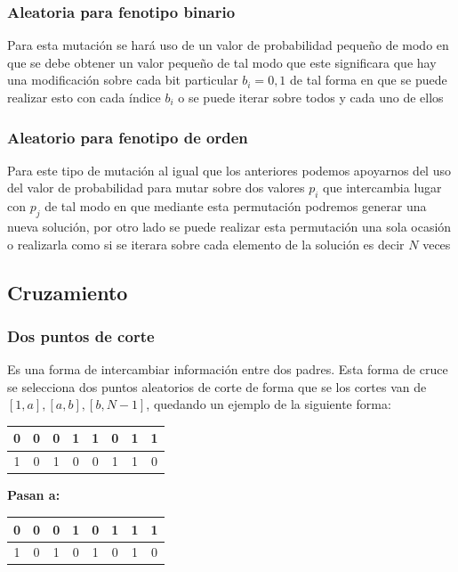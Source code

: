 \documentclass[10pt]{article}
\begin{document}
\subsubsection{Aleatoria para fenotipo binario}
Para esta mutación se hará uso de un valor de probabilidad pequeño de modo en que se debe obtener un valor pequeño de tal modo que este significara que hay una modificación sobre cada bit particular $b_{i}={0,1}$ de tal forma en que se puede realizar esto con cada índice $b_{i}$ o se puede iterar sobre todos y cada uno de ellos
\subsubsection{Aleatorio para fenotipo de orden}
Para este tipo de mutación al igual que los anteriores podemos apoyarnos del uso del valor de probabilidad para mutar sobre dos valores $p_{i}$ que intercambia lugar con $p_{j}$ de tal modo en que mediante esta permutación podremos generar una nueva solución, por otro lado se puede realizar esta permutación una sola ocasión o realizarla como si se iterara sobre cada elemento de la solución es decir $N$ veces
\subsection{Cruzamiento}
\subsubsection{Dos puntos de corte}
Es una forma de intercambiar información entre dos padres. Esta forma de cruce se selecciona dos puntos aleatorios de corte de forma que se los cortes van de $[1,a],[a,b],[b,N-1]$, quedando un ejemplo de la siguiente forma:
\begin{center}
  \begin{tabular}{|c|c|c|c|c|c|c|c|}
    \hline
    \color{green}0&\color{green}0&\color{green}0&\color{green}1&\color{blue}1&\color{blue}0&\color{green}1&\color{green}1\\
    \hline
    \color{red}1&\color{red}0&\color{red}1&\color{red}0&\color{yellow}0&\color{yellow}1&\color{red}1&\color{red}0\\
    \hline
  \end{tabular}
  \textbf{Pasan a:}
  \begin{tabular}{|c|c|c|c|c|c|c|c|}
    \hline
    \color{green}0&\color{green}0&\color{green}0&\color{green}1&\color{yellow}0&\color{yellow}1&\color{green}1&\color{green}1\\
    \hline
    \color{red}1&\color{red}0&\color{red}1&\color{red}0&\color{blue}1&\color{blue}0&\color{red}1&\color{red}0\\
    \hline
  \end{tabular}
\end{center}
\end{document}
